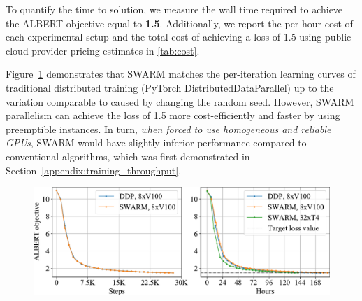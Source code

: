 To quantify the time to solution, we measure the wall time required to achieve the ALBERT objective equal to \textbf{1.5}. Additionally, we report the per-hour cost of each experimental setup and the total cost of achieving a loss of 1.5 using public cloud provider pricing estimates in \cref{tab:cost}.

Figure~\ref{fig:convergence_iterations} demonstrates that SWARM matches the per-iteration learning curves of traditional distributed training (PyTorch DistributedDataParallel) up to the variation comparable to caused by changing the random seed. However, SWARM parallelism can achieve the loss of 1.5 more cost-efficiently and faster by using preemptible instances. In turn, \textit{when forced to use homogeneous and reliable GPUs}, SWARM would have slightly inferior performance compared to conventional algorithms, which was first demonstrated in Section~\ref{appendix:training_throughput}.

\begin{figure}
\centering
\includegraphics[width=\linewidth]{resources/albert_learning_curves.pdf}
\label{fig:convergence_iterations}
\end{figure}